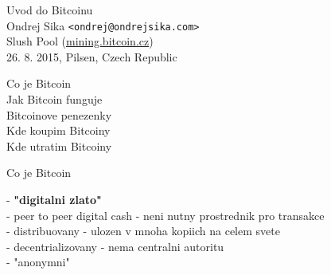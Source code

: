 \documentclass{beamer}
\begin{document}
\begin{frame}

    {\LARGE Uvod do Bitcoinu}\\
    \vspace{7mm}
    {\Large Ondrej Sika \lstinline|<ondrej@ondrejsika.com>|}\\
    \vspace{7mm}
    {\large Slush Pool (\url{mining.bitcoin.cz})}\\
    \vspace{7mm}
    26. 8. 2015, Pilsen, Czech Republic\\

\end{frame}

\begin{frame}

    {\LARGE Co je Bitcoin}\\
    \vspace{5mm}
    {\LARGE Jak Bitcoin funguje}\\
    \vspace{5mm}
    {\LARGE Bitcoinove penezenky}\\
    \vspace{5mm}
    {\LARGE Kde koupim Bitcoiny}\\
    \vspace{5mm}
    {\LARGE Kde utratim Bitcoiny}\\

\end{frame}

\begin{frame}

    {\LARGE Co je Bitcoin}\\

    \vspace{5mm}

    - {\bf "digitalni zlato"}\\
    - peer to peer digital cash - neni nutny prostrednik pro transakce\\
    - distribuovany - ulozen v mnoha kopiich na celem svete\\
    - decentrializovany - nema centralni autoritu\\
    - "anonymni"\\

\end{frame}
\end{document}
